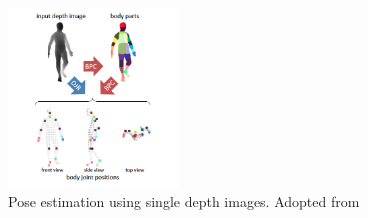 \begin{figure}[H]
\centering
\includegraphics[width=0.4\textwidth]{assets/kinect_approaches.png}
\caption[Human pose estimation using single depth images]{Pose estimation using single depth images. {Adopted from \cite{shotton2013efficient}}}
\label{fig:kinect_pose}
\end{figure} 
